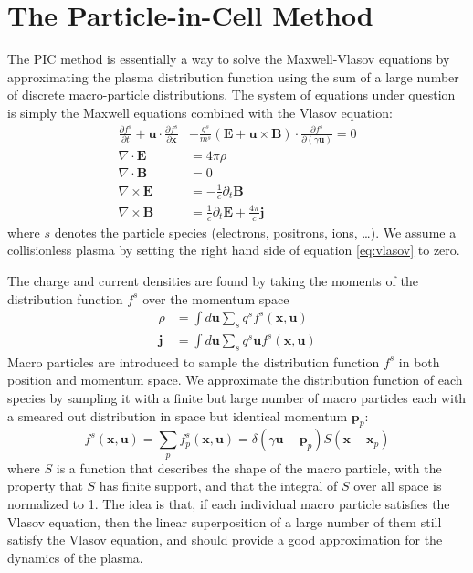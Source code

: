 \section{The Particle-in-Cell Method}
\label{sec:particle-cell-method}
The PIC method is essentially a way to solve the Maxwell-Vlasov
equations by approximating the plasma distribution function using the
sum of a large number of discrete macro-particle distributions. The
system of equations under question is simply the Maxwell equations
combined with the Vlasov equation:
\begin{align}
    \frac{\partial f^{s}}{\partial t} + \mathbf{u}\cdot\frac{\partial f^s}{\partial \mathbf{x}} &+ \frac{q^s}{m^s}(\mathbf{E} + \mathbf{u}\times \mathbf{B})\cdot\frac{\partial f^s}{\partial (\gamma \mathbf{u})} = 0 \label{eq:vlasov}\\
    \nabla\cdot \mathbf{E} &= 4\pi\rho \\
    \nabla\cdot \mathbf{B} &= 0 \\
    \nabla\times \mathbf{E} &= -\frac{1}{c}\partial_t \mathbf{B} \\
    \nabla\times \mathbf{B} &= \frac{1}{c}\partial_t \mathbf{E} + \frac{4\pi}{c} \mathbf{j}
\end{align}
where $s$ denotes the particle species (electrons, positrons, ions,
\dots). We assume a collisionless plasma by setting the right hand
side of equation \eqref{eq:vlasov} to zero.

The charge and current densities are found by taking the moments of
the distribution function $f^s$ over the momentum space
\begin{align}
  \rho &= \int d \mathbf{u} \sum_s q^s f^s(\mathbf{x}, \mathbf{u}) \label{eqn:pic-rho} \\
  \mathbf{j} &= \int d \mathbf{u} \sum_s q^s \mathbf{u} f^s(\mathbf{x}, \mathbf{u}) \label{eqn:pic-j}
\end{align}
Macro particles are introduced to sample the distribution function $f^s$ in both
position and momentum space. We approximate the distribution function of each
species by sampling it with a finite but large number of macro particles each
with a smeared out distribution in space but identical momentum
$\mathbf{p}_{p}$:
\begin{equation}
    \label{eq:single-particle}
    f^s(\mathbf{x}, \mathbf{u}) = \sum_{p}f^s_{p}(\mathbf{x}, \mathbf{u}) = \delta(\gamma \mathbf{u} - \mathbf{p}_{p}) S(\mathbf{x} - \mathbf{x}_{p})
\end{equation}
where $S$ is a function that describes the shape of the macro
particle, with the property that $S$ has finite support, and that the
integral of $S$ over all space is normalized to 1. The idea is that,
if each individual macro particle satisfies the Vlasov equation, then
the linear superposition of a large number of them still satisfy the
Vlasov equation, and should provide a good approximation for the
dynamics of the plasma.

